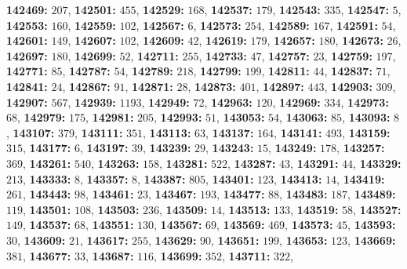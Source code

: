 \textsf{\bfseries 142469:} $207$, \textsf{\bfseries 142501:} $455$, \textsf{\bfseries 142529:} $168$, \textsf{\bfseries 142537:} $179$, \textsf{\bfseries 142543:} $335$, \textsf{\bfseries 142547:} $5$, \textsf{\bfseries 142553:} $160$, \textsf{\bfseries 142559:} $102$, \textsf{\bfseries 142567:} $6$, \textsf{\bfseries 142573:} $254$, \textsf{\bfseries 142589:} $167$, \textsf{\bfseries 142591:} $54$, \textsf{\bfseries 142601:} $149$, \textsf{\bfseries 142607:} $102$, \textsf{\bfseries 142609:} $42$, \textsf{\bfseries 142619:} $179$, \textsf{\bfseries 142657:} $180$, \textsf{\bfseries 142673:} $26$, \textsf{\bfseries 142697:} $180$, \textsf{\bfseries 142699:} $52$, \textsf{\bfseries 142711:} $255$, \textsf{\bfseries 142733:} $47$, \textsf{\bfseries 142757:} $23$, \textsf{\bfseries 142759:} $197$, \textsf{\bfseries 142771:} $85$, \textsf{\bfseries 142787:} $54$, \textsf{\bfseries 142789:} $218$, \textsf{\bfseries 142799:} $199$, \textsf{\bfseries 142811:} $44$, \textsf{\bfseries 142837:} $71$, \textsf{\bfseries 142841:} $24$, \textsf{\bfseries 142867:} $91$, \textsf{\bfseries 142871:} $28$, \textsf{\bfseries 142873:} $401$, \textsf{\bfseries 142897:} $443$, \textsf{\bfseries 142903:} $309$, \textsf{\bfseries 142907:} $567$, \textsf{\bfseries 142939:} $1193$, \textsf{\bfseries 142949:} $72$, \textsf{\bfseries 142963:} $120$, \textsf{\bfseries 142969:} $334$, \textsf{\bfseries 142973:} $68$, \textsf{\bfseries 142979:} $175$, \textsf{\bfseries 142981:} $205$, \textsf{\bfseries 142993:} $51$, \textsf{\bfseries 143053:} $54$, \textsf{\bfseries 143063:} $85$, \textsf{\bfseries 143093:} $8$, \textsf{\bfseries 143107:} $379$, \textsf{\bfseries 143111:} $351$, \textsf{\bfseries 143113:} $63$, \textsf{\bfseries 143137:} $164$, \textsf{\bfseries 143141:} $493$, \textsf{\bfseries 143159:} $315$, \textsf{\bfseries 143177:} $6$, \textsf{\bfseries 143197:} $39$, \textsf{\bfseries 143239:} $29$, \textsf{\bfseries 143243:} $15$, \textsf{\bfseries 143249:} $178$, \textsf{\bfseries 143257:} $369$, \textsf{\bfseries 143261:} $540$, \textsf{\bfseries 143263:} $158$, \textsf{\bfseries 143281:} $522$, \textsf{\bfseries 143287:} $43$, \textsf{\bfseries 143291:} $44$, \textsf{\bfseries 143329:} $213$, \textsf{\bfseries 143333:} $8$, \textsf{\bfseries 143357:} $8$, \textsf{\bfseries 143387:} $805$, \textsf{\bfseries 143401:} $123$, \textsf{\bfseries 143413:} $14$, \textsf{\bfseries 143419:} $261$, \textsf{\bfseries 143443:} $98$, \textsf{\bfseries 143461:} $23$, \textsf{\bfseries 143467:} $193$, \textsf{\bfseries 143477:} $88$, \textsf{\bfseries 143483:} $187$, \textsf{\bfseries 143489:} $119$, \textsf{\bfseries 143501:} $108$, \textsf{\bfseries 143503:} $236$, \textsf{\bfseries 143509:} $14$, \textsf{\bfseries 143513:} $133$, \textsf{\bfseries 143519:} $58$, \textsf{\bfseries 143527:} $149$, \textsf{\bfseries 143537:} $68$, \textsf{\bfseries 143551:} $130$, \textsf{\bfseries 143567:} $69$, \textsf{\bfseries 143569:} $469$, \textsf{\bfseries 143573:} $45$, \textsf{\bfseries 143593:} $30$, \textsf{\bfseries 143609:} $21$, \textsf{\bfseries 143617:} $255$, \textsf{\bfseries 143629:} $90$, \textsf{\bfseries 143651:} $199$, \textsf{\bfseries 143653:} $123$, \textsf{\bfseries 143669:} $381$, \textsf{\bfseries 143677:} $33$, \textsf{\bfseries 143687:} $116$, \textsf{\bfseries 143699:} $352$, \textsf{\bfseries 143711:} $322$, 
